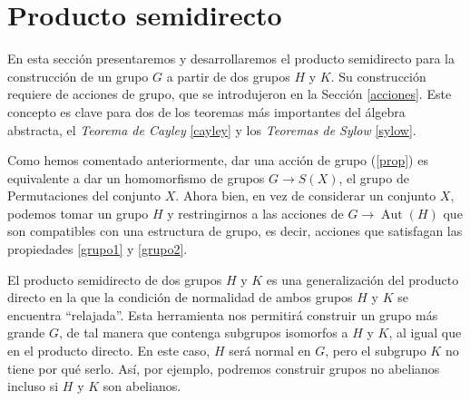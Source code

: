 \newpage
\section{Producto semidirecto} \label{semidirect1}
En esta sección presentaremos y desarrollaremos el producto semidirecto para la construcción de un grupo $G$ a partir de dos grupos $H$ y $K$. Su construcción requiere de acciones de grupo, que se introdujeron en la Sección \ref{acciones}. Este concepto es clave para dos de los teoremas más importantes del álgebra abstracta, el \textit{Teorema de Cayley} \ref{cayley} y los \textit{Teoremas de Sylow} \ref{sylow}.



Como hemos comentado anteriormente, dar una acción de grupo (\ref{prop}) es equivalente a dar un homomorfismo de grupos $G \rightarrow S(X)$, el grupo de Permutaciones del conjunto $X$. Ahora bien, en vez de considerar un conjunto $X$, podemos tomar un grupo $H$ y restringirnos a las acciones de $G \rightarrow \operatorname{Aut}(H)$ que son compatibles con una estructura de grupo, es decir, acciones que satisfagan las propiedades \ref{grupo1} y \ref{grupo2}.



El producto semidirecto de dos grupos $H$ y $K$ es una generalización del producto directo en la que la condición de normalidad de ambos grupos $H$ y $K$ se encuentra ``relajada''. Esta herramienta nos permitirá construir un grupo más grande $G$, de tal manera que contenga subgrupos isomorfos a $H$ y $K$, al igual que en el producto directo. En este caso, $H$ será normal en $G$, pero el subgrupo $K$ no tiene por qué serlo.
Así, por ejemplo, podremos construir grupos no abelianos incluso si $H$ y $K$ son abelianos.


